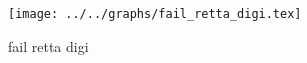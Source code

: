 \begin{figure}[h] \centering\texttt{[image: ../../graphs/fail\_retta\_digi.tex]}\caption{fail retta digi}\label{gr:fail_retta_digi} \end{figure}
